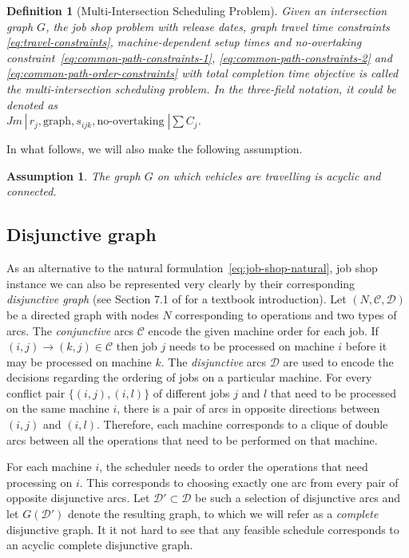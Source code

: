 \documentclass{article}
\theoremstyle{definition}
\theoremstyle{plain}
\newtheorem{define}{Definition}[section]
\newtheorem{assump}{Assumption}[section]
\begin{document}
\begin{define}[Multi-Intersection Scheduling Problem]
  Given an intersection graph $G$, the job shop problem with release dates,
  graph travel time constraints \eqref{eq:travel-constraints}, machine-dependent
  setup times and no-overtaking constraint~\eqref{eq:common-path-constraints-1},
  \eqref{eq:common-path-constraints-2} and
  \eqref{eq:common-path-order-constraints} with total completion time objective
  is called the {\normalfont multi-intersection scheduling problem}. In the
  three-field notation, it could be denoted as \\
  $Jm \, | \, r_{j}, \text{graph}, s_{ijk}, \text{no-overtaking} \; | \sum C_{j}$.
\end{define}

In what follows, we will also make the following assumption.
\begin{assump}
The graph $G$ on which vehicles are travelling is acyclic and connected.
\end{assump}


\newpage

\subsection{Disjunctive graph}

As an alternative to the natural formulation~\eqref{eq:job-shop-natural}, job
shop instance we can also be represented very clearly by their corresponding
\textit{disjunctive graph} (see Section 7.1 of
\cite{pinedoSchedulingTheoryAlgorithms2016} for a textbook introduction). Let
$(N, \mathcal{C}, \mathcal{D})$ be a directed graph with nodes $N$ corresponding
to operations and two types of arcs. The \textit{conjunctive} arcs $\mathcal{C}$
encode the given machine order for each job. If
$(i,j) \rightarrow (k, j) \in \mathcal{C}$ then job $j$ needs to be processed on
machine $i$ before it may be processed on machine $k$. The \textit{disjunctive}
arcs $\mathcal{D}$ are used to encode the decisions regarding the ordering of
jobs on a particular machine. For every conflict pair $\{(i,j), (i,l)\}$ of
different jobs $j$ and $l$ that need to be processed on the same machine $i$,
there is a pair of arcs in opposite directions between $(i,j)$ and $(i,l)$.
Therefore, each machine corresponds to a clique of double arcs between all the
operations that need to be performed on that machine.

For each machine $i$, the scheduler needs to order the operations that need processing on
$i$. This corresponds to choosing exactly one arc from every pair of opposite
disjunctive arcs. Let $\mathcal{D}' \subset \mathcal{D}$ be such a selection of
disjunctive arcs and let $G(\mathcal{D}')$ denote the resulting graph, to which
we will refer as a \textit{complete} disjunctive graph. It it not hard to see
that any feasible schedule corresponds to an acyclic complete disjunctive
graph.
\end{document}

